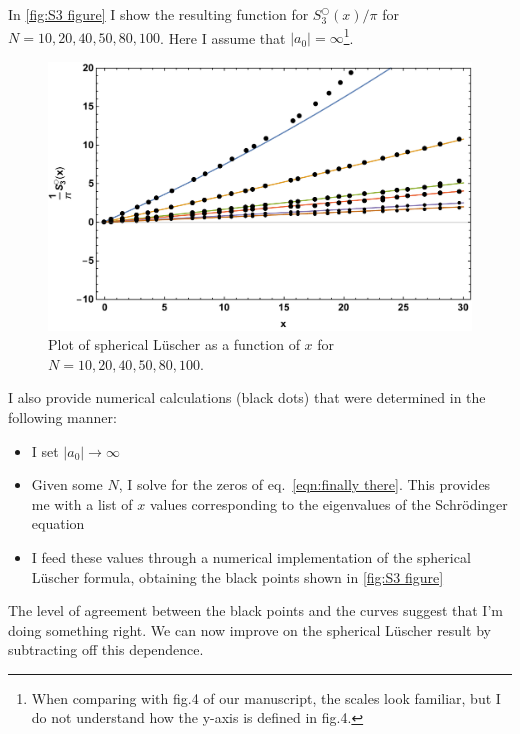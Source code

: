 \documentclass[11pt]{article}
\begin{document}
In \autoref{fig:S3 figure} I show the resulting function for $S^\bigcirc_3(x)/\pi$ for $N=10,20,40,50,80,100$.  Here I assume that $|a_0|=\infty$\footnote{When comparing with fig.4 of our manuscript, the scales look familiar, but I do not understand how the y-axis is defined in fig.4.}.
\begin{figure}
\center
\includegraphics[width=.8\textwidth]{figs/S3_figure.pdf}
\caption{Plot of spherical L\"uscher as a function of $x$ for $N=10,20,40,50,80,100$.  \label{fig:S3 figure}}
\end{figure}
I also provide numerical calculations (black dots) that were determined in the following manner:
\begin{itemize}
\item I set $|a_0|\to\infty$
\item Given some $N$, I solve for the zeros of eq.~\eqref{eqn:finally there}.  This provides me with a list of $x$ values corresponding to the eigenvalues of the Schr\"odinger equation
\item I feed these values through a numerical implementation of the spherical L\"uscher formula, obtaining the black points shown in \autoref{fig:S3 figure}
\end{itemize}
The level of agreement between the black points and the curves suggest that I'm doing something right.  We can now improve on the spherical L\"uscher result by subtracting off this dependence.


%
\end{document}
